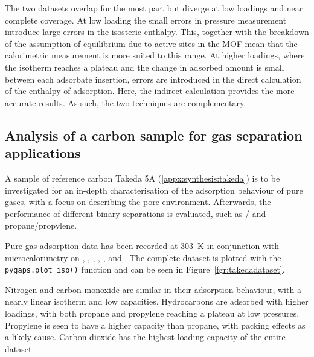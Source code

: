 The two datasets overlap for the most part but
diverge at low loadings and near complete
coverage. At low loading the small errors in pressure measurement introduce
large errors in the isosteric enthalpy. This, together with the breakdown
of the assumption of equilibrium due to active sites in the MOF mean that
the calorimetric measurement is more suited to this range. At higher
loadings, where the isotherm reaches a plateau and the change in adsorbed
amount is small between each adsorbate insertion, errors are
introduced in the direct calculation of the enthalpy of adsorption.
Here, the indirect calculation provides the more accurate results.
As such, the two techniques are complementary.

\subsection{Analysis of a carbon sample for gas separation applications}

A sample of reference carbon Takeda 5A (\autoref{appx:synthesis:takeda})
is to be investigated for an in-depth characterisation of
the adsorption behaviour of pure gases, with a focus on describing the pore environment.
Afterwards, the performance of different binary separations is evaluated,
such as / and propane/propylene.

Pure gas adsorption data has been recorded at \SI{303}{\kelvin} in
conjunction with
microcalorimetry on , , , , ,
 and . The complete dataset is plotted with the
\lstinline{pygaps.plot_iso()} function and can be seen in Figure~\ref{fgr:takedadataset}.

Nitrogen and carbon monoxide are similar in their adsorption behaviour,
with a nearly linear isotherm and low capacities.
Hydrocarbons are adsorbed with higher loadings, with both propane and propylene
reaching a plateau at low pressures. Propylene is seen to have a
higher capacity than propane, with packing effects as a likely cause.
Carbon dioxide has the highest loading capacity of the entire dataset.

